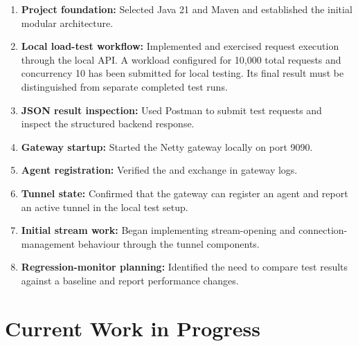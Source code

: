 \documentclass[11pt,a4paper,oneside]{report}
\newcommand{\code}[1]{\texttt{\detokenize{#1}}}
\begin{document}
\begin{enumerate}
  \item \textbf{Project foundation:}
  Selected Java 21 and Maven and established the initial
  modular architecture.

  \item \textbf{Local load-test workflow:}
  Implemented and exercised request execution through the local API.
  A workload configured for 10,000 total requests and concurrency 10
  has been submitted for local testing. Its final result must be
  distinguished from separate completed test runs.

  \item \textbf{JSON result inspection:}
  Used Postman to submit test requests and inspect the
  structured backend response.

  \item \textbf{Gateway startup:}
  Started the Netty gateway locally on port 9090.

  \item \textbf{Agent registration:}
  Verified the \code{REGISTER} and \code{REGISTER\_ACK}
  exchange in gateway logs.

  \item \textbf{Tunnel state:}
  Confirmed that the gateway can register an agent and report
  an active tunnel in the local test setup.

  \item \textbf{Initial stream work:}
  Began implementing stream-opening and connection-management
  behaviour through the tunnel components.

  \item \textbf{Regression-monitor planning:}
  Identified the need to compare test results against a
  baseline and report performance changes.
\end{enumerate}

\section{Current Work in Progress}
\end{document}
